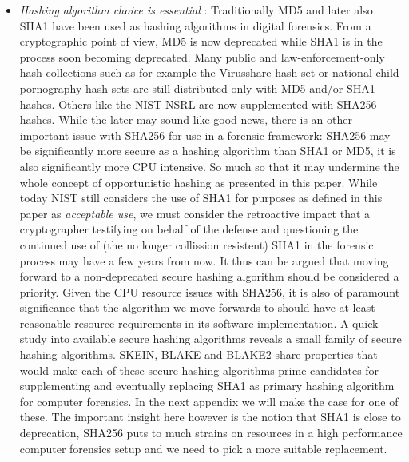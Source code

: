 \begin{itemize}
\item \emph{Hashing algorithm choice is essential} :  Traditionally MD5 and later also SHA1 have been used as hashing algorithms in digital forensics. From a cryptographic point of view, MD5 is now deprecated while SHA1 is in the process soon becoming deprecated. Many public and law-enforcement-only hash collections such as for example the Virusshare hash set or national child pornography hash sets are still distributed only with MD5 and/or SHA1 hashes. Others like the NIST NSRL are now supplemented with SHA256 hashes. While the later may sound like good news, there is an other important issue with SHA256 for use in a forensic framework: SHA256 may be significantly more secure as a hashing algorithm than SHA1 or MD5, it is also significantly more CPU intensive. So much so that it may undermine the whole concept of opportunistic hashing as presented in this paper. While today NIST still considers the use of SHA1 for purposes as defined in this paper as \emph{acceptable use}, we must consider the retroactive impact that a cryptographer testifying on behalf of the defense and questioning the continued use of (the no longer collission resistent) SHA1 in the forensic process may have a few years from now. It thus can be argued that moving forward to a non-deprecated secure hashing algorithm should be considered a priority. Given the CPU resource issues with SHA256, it is also of paramount significance that the algorithm we move forwards to should have at least reasonable resource requirements in its software implementation. A quick study into available secure hashing algorithms reveals a small family of secure hashing algorithms. SKEIN, BLAKE and BLAKE2 share properties that would make each of these secure hashing algorithms prime candidates for supplementing and eventually replacing SHA1 as primary hashing algorithm for computer forensics. In the next appendix we will make the case for one of these. The important insight here however is the notion that SHA1 is close to deprecation, SHA256 puts to much strains on resources in a high performance computer forensics setup and we need to pick a more suitable replacement.     
\end{itemize}
